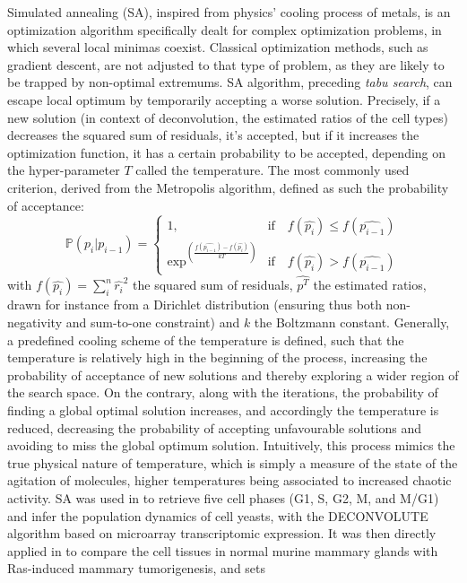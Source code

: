 Simulated annealing (SA), inspired from physics' cooling process of
metals, is an optimization algorithm
\autocite{kirkpatrick_etal83} specifically dealt for complex optimization problems, in
which several local minimas coexist. Classical optimization methods,
such as gradient descent, are not adjusted to that type of problem, as
they are likely to be trapped by non-optimal extremums. SA algorithm,
preceding \emph{tabu search}, can escape local optimum by temporarily
accepting a worse solution. Precisely, if a new solution (in context of
deconvolution, the estimated ratios of the cell types) decreases the
squared sum of residuals, it's accepted, but if it increases the
optimization function, it has a certain probability to be accepted,
depending on the hyper-parameter \(T\) called the temperature. The most
commonly used criterion, derived from the Metropolis algorithm, defined
as such the probability of acceptance: \[
\mathbb{P} (p_i | p_{i-1}) =
\begin{cases}
1, & \text{if} \quad f(\hat{p_{i}}) \le f(\hat{p_{i-1}})\\
\exp^{\left(\frac{f(\hat{p_{i-1}}) - f(\hat{p_{i}})}{kT} \right)} & \text{if} \quad f(\hat{p_{i}}) > f(\hat{p_{i-1}})
\end{cases}
\] with \(f(\hat{p_i}) = \sum_{i}^n \hat{r_i}^2\) the squared sum of
residuals, \(\hat{p^T}\) the estimated ratios, drawn for instance from a
Dirichlet distribution (ensuring thus both non-negativity and sum-to-one
constraint) and \(k\) the Boltzmann constant. Generally, a predefined
cooling scheme of the temperature is defined, such that the temperature
is relatively high in the beginning of the process, increasing the
probability of acceptance of new solutions and thereby exploring a wider
region of the search space. On the contrary, along with the iterations,
the probability of finding a global optimal solution increases, and
accordingly the temperature is reduced, decreasing the probability of
accepting unfavourable solutions and avoiding to miss the global optimum
solution. Intuitively, this process mimics the true physical nature of
temperature, which is simply a measure of the state of the agitation of
molecules, higher temperatures being associated to increased chaotic
activity. SA was used in \autocite{lu_etal03} to retrieve five cell phases (G1, S,
G2, M, and M/G1) and infer the population dynamics of cell yeasts, with
the DECONVOLUTE algorithm based on microarray transcriptomic expression.
It was then directly applied in \autocite{wang_etal06} to compare the cell tissues in normal
murine mammary glands with Ras-induced mammary tumorigenesis, and sets
